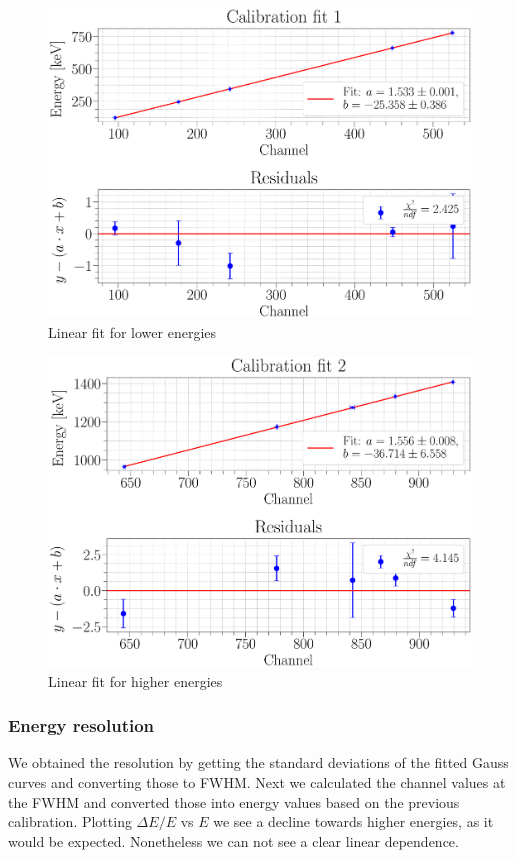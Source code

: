 \documentclass[a4paper,12pt]{article}
\begin{document}
\begin{figure}[H]
\centering
\includegraphics[scale=0.25]{../Figures/Calibration_fit_1.eps}
\caption{Linear fit for lower energies}
\label{calibFit}
\end{figure}

\begin{figure}[H]
\centering
\includegraphics[scale=0.25]{../Figures/Calibration_fit_2.eps}
\caption{Linear fit for higher energies}
\label{calibFit}
\end{figure}

\subsubsection{Energy resolution}
We obtained the resolution by getting the standard deviations of the fitted Gauss curves and converting those to FWHM. Next we calculated the channel values at the FWHM and converted those into energy values based on the previous calibration. Plotting $\Delta E/E$ vs $E$ we see a decline towards higher energies, as it would be expected. Nonetheless we can not see a clear linear dependence.
\end{document}
